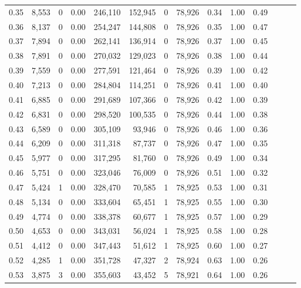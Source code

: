 \begin{tabular}{rrrrrrrrrrrrrr}
0.35 &  8,553 &      0 &  0.00 &  246,110 &  152,945 &       0 &  78,926 &  0.34 &  1.00 &      0.49 \\
0.36 &  8,137 &      0 &  0.00 &  254,247 &  144,808 &       0 &  78,926 &  0.35 &  1.00 &      0.47 \\
0.37 &  7,894 &      0 &  0.00 &  262,141 &  136,914 &       0 &  78,926 &  0.37 &  1.00 &      0.45 \\
0.38 &  7,891 &      0 &  0.00 &  270,032 &  129,023 &       0 &  78,926 &  0.38 &  1.00 &      0.44 \\
0.39 &  7,559 &      0 &  0.00 &  277,591 &  121,464 &       0 &  78,926 &  0.39 &  1.00 &      0.42 \\
0.40 &  7,213 &      0 &  0.00 &  284,804 &  114,251 &       0 &  78,926 &  0.41 &  1.00 &      0.40 \\
0.41 &  6,885 &      0 &  0.00 &  291,689 &  107,366 &       0 &  78,926 &  0.42 &  1.00 &      0.39 \\
0.42 &  6,831 &      0 &  0.00 &  298,520 &  100,535 &       0 &  78,926 &  0.44 &  1.00 &      0.38 \\
0.43 &  6,589 &      0 &  0.00 &  305,109 &   93,946 &       0 &  78,926 &  0.46 &  1.00 &      0.36 \\
0.44 &  6,209 &      0 &  0.00 &  311,318 &   87,737 &       0 &  78,926 &  0.47 &  1.00 &      0.35 \\
0.45 &  5,977 &      0 &  0.00 &  317,295 &   81,760 &       0 &  78,926 &  0.49 &  1.00 &      0.34 \\
0.46 &  5,751 &      0 &  0.00 &  323,046 &   76,009 &       0 &  78,926 &  0.51 &  1.00 &      0.32 \\
0.47 &  5,424 &      1 &  0.00 &  328,470 &   70,585 &       1 &  78,925 &  0.53 &  1.00 &      0.31 \\
0.48 &  5,134 &      0 &  0.00 &  333,604 &   65,451 &       1 &  78,925 &  0.55 &  1.00 &      0.30 \\
0.49 &  4,774 &      0 &  0.00 &  338,378 &   60,677 &       1 &  78,925 &  0.57 &  1.00 &      0.29 \\
0.50 &  4,653 &      0 &  0.00 &  343,031 &   56,024 &       1 &  78,925 &  0.58 &  1.00 &      0.28 \\
0.51 &  4,412 &      0 &  0.00 &  347,443 &   51,612 &       1 &  78,925 &  0.60 &  1.00 &      0.27 \\
0.52 &  4,285 &      1 &  0.00 &  351,728 &   47,327 &       2 &  78,924 &  0.63 &  1.00 &      0.26 \\
0.53 &  3,875 &      3 &  0.00 &  355,603 &   43,452 &       5 &  78,921 &  0.64 &  1.00 &      0.26 \\

\end{tabular}
